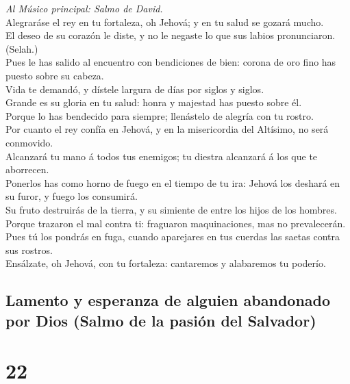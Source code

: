  \emph{Al Músico principal: Salmo de David.}\\
Alegraráse el rey en tu fortaleza, oh Jehová; y en tu salud se gozará
mucho.\\
 El deseo de su corazón le diste, y no le negaste lo que sus
labios pronunciaron. (Selah.)\\
 Pues le has salido al encuentro con bendiciones de bien:
corona de oro fino has puesto sobre su cabeza.\\
 Vida te demandó, y dístele largura de días por siglos y
siglos.\\
 Grande es su gloria en tu salud: honra y majestad has
puesto sobre él.\\
 Porque lo has bendecido para siempre; llenástelo de alegría
con tu rostro.\\
 Por cuanto el rey confía en Jehová, y en la misericordia
del Altísimo, no será conmovido.\\
 Alcanzará tu mano á todos tus enemigos; tu diestra
alcanzará á los que te aborrecen.\\
 Ponerlos has como horno de fuego en el tiempo de tu ira:
Jehová los deshará en su furor, y fuego los consumirá.\\
 Su fruto destruirás de la tierra, y su simiente de entre
los hijos de los hombres.\\
 Porque trazaron el mal contra ti: fraguaron maquinaciones,
mas no prevalecerán.\\
 Pues tú los pondrás en fuga, cuando aparejares en tus
cuerdas las saetas contra sus rostros.\\
 Ensálzate, oh Jehová, con tu fortaleza: cantaremos y
alabaremos tu poderío.

\hypertarget{lamento-y-esperanza-de-alguien-abandonado-por-dios-salmo-de-la-pasiuxf3n-del-salvador}{%
\subsection{Lamento y esperanza de alguien abandonado por Dios (Salmo de
la pasión del
Salvador)}\label{lamento-y-esperanza-de-alguien-abandonado-por-dios-salmo-de-la-pasiuxf3n-del-salvador}}

\hypertarget{section-21}{%
\section{22}\label{section-21}}

